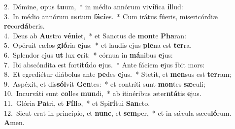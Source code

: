 {2.~}Dómine, \textbf{o}pus \textbf{tu}um,~* in médio annórum vi\textbf{ví}fica \textbf{il}lud:\\
{3.~}In médio annórum \textbf{no}tum \textbf{fá}\textbf{ci}es.~* Cum irátus fúeris, misericórdiæ \textbf{re}cor\textbf{dá}beris.\\
{4.~}Deus ab \textbf{Au}stro \textbf{vé}\textbf{ni}et,~* et Sanctus de \textbf{mon}te \textbf{Pha}ran:\\
{5.~}Opéruit cælos \textbf{gló}ria \textbf{e}jus:~* et laudis ejus \textbf{ple}na est \textbf{ter}ra.\\
{6.~}Splendor ejus \textbf{ut} lux \textbf{e}rit:~* córnua in \textbf{má}nibus \textbf{e}jus:\\
{7.~}Ibi abscóndita est forti\textbf{tú}do \textbf{e}jus.~* Ante fáciem \textbf{e}jus \textbf{i}bit mors:\\
{8.~}Et egrediétur diábolus ante \textbf{pe}des \textbf{e}jus.~* Stetit, et \textbf{men}sus est \textbf{ter}ram;\\
{9.~}Aspéxit, et dis\textbf{sól}vit \textbf{Gen}tes:~* et contríti sunt \textbf{mon}tes \textbf{sæ}culi;\\
{10.~}Incurváti sunt \textbf{col}les \textbf{mun}di,~* ab itinéribus æter\textbf{ntá}tis \textbf{e}jus.\\
{11.~}Glória \textbf{Pa}tri, et \textbf{Fí}\textbf{li}o,~* et Spi\textbf{rí}tui \textbf{San}cto.\\
{12.~}Sicut erat in princípio, et \textbf{nunc}, et \textbf{sem}per,~* et in sǽcula sæcu\textbf{ló}rum. \textbf{A}men.\\
